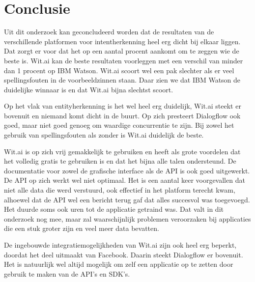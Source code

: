 
\chapter{Conclusie}
\label{ch:conclusie}


Uit dit onderzoek kan geconcludeerd worden dat de resultaten van de verschillende platformen voor intentherkenning heel erg dicht bij elkaar liggen. Dat zorgt er voor dat het op een aantal procent aankomt om te zeggen wie de beste is. Wit.ai kan de beste resultaten voorleggen met een verschil van minder dan 1 procent op IBM Watson. Wit.ai scoort wel een pak slechter als er veel spellingsfouten in de voorbeeldzinnen staan. Daar zien we dat IBM Watson de duidelijke winnaar is en dat Wit.ai bijna slechtst scoort.

Op het vlak van entityherkenning is het wel heel erg duidelijk, Wit.ai steekt er bovenuit en niemand komt dicht in de buurt. Op zich presteert Dialogflow ook goed, maar niet goed genoeg om waardige concurrentie te zijn. Bij zowel het gebruik van spellingsfouten als zonder is Wit.ai duidelijk de beste.

Wit.ai is op zich vrij gemakkelijk te gebruiken en heeft als grote voordelen dat het volledig gratis te gebruiken is en dat het bijna alle talen ondersteund. De documentatie voor zowel de grafische interface als de API is ook goed uitgewerkt. De API op zich werkt wel niet optimaal. Het is een aantal keer voorgevallen dat niet alle data die werd verstuurd, ook effectief in het platform terecht kwam, alhoewel dat de API wel een bericht terug gaf dat alles succesvol was toegevoegd. Het duurde soms ook uren tot de applicatie getraind was. Dat valt in dit onderzoek nog mee, maar zal waarschijnlijk problemen veroorzaken bij applicaties die een stuk groter zijn en veel meer data bevatten.

De ingebouwde integratiemogelijkheden van Wit.ai zijn ook heel erg beperkt, doordat het deel uitmaakt van Facebook. Daarin steekt Dialogflow er bovenuit. Het is natuurlijk wel altijd mogelijk om zelf een applicatie op te zetten door gebruik te maken van de API’s en SDK’s.

